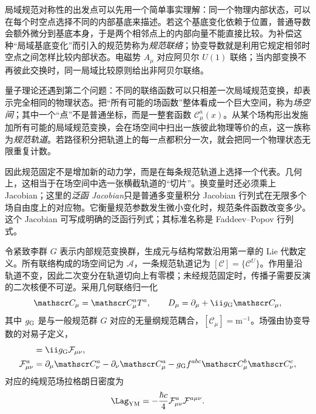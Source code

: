 局域规范对称性的出发点可以先用一个简单事实理解：同一个物理内部状态，可以在每个时空点选择不同的内部基底来描述。若这个基底变化依赖于位置，普通导数会额外微分到基底本身，于是两个相邻点上的内部向量不能直接比较。为补偿这种“局域基底变化”而引入的规范势称为\emph{规范联络}；协变导数就是利用它规定相邻时空点之间怎样比较内部状态。电磁势 $A_\mu$ 对应阿贝尔 $U(1)$ 联络；当内部变换不再彼此交换时，同一局域比较原则给出非阿贝尔联络。

量子理论还遇到第二个问题：不同的联络函数可以只相差一次局域规范变换，却表示完全相同的物理状态。把“所有可能的场函数”整体看成一个巨大空间，称为\emph{场空间}；其中一个“点”不是普通坐标，而是一整套函数 $\mathscr C_\mu^a(x)$。从某个场构形出发施加所有可能的局域规范变换，会在场空间中扫出一族彼此物理等价的点，这一族称为\emph{规范轨道}。若路径积分把轨道上的每一点都积分一次，就会把同一个物理状态无限重复计数。

因此规范固定不是增加新的动力学，而是在每条规范轨道上选择一个代表。几何上，这相当于在场空间中选一张横截轨道的“切片”。换变量时还必须乘上 Jacobian；这里的\emph{泛函 Jacobian}只是普通多变量积分 Jacobian 行列式在无限多个场自由度上的对应物。它衡量规范参数发生微小变化时，规范条件函数改变多少。这个 Jacobian 可写成明确的泛函行列式；其标准名称是 Faddeev--Popov 行列式。

令紧致李群 $G$ 表示内部规范变换群，生成元与结构常数沿用第一章的 Lie 代数定义。所有联络构成的场空间记为 $\mathscr A$，一条规范轨道记为 $[\mathscr C]=\{\mathscr C^U\}$。作用量沿轨道不变，因此二次变分在轨道切向上有零模；未经规范固定时，传播子需要反演的二次核便不可逆。采用几何联络归一化
\begin{equation}
 \mathscr C_\mu=\mathscr C_\mu^aT^a,
 \qquad
 D_\mu=\partial_\mu+\ii g_{\rm G}\mathscr C_\mu,
 \label{eq:generic-gauge-cov-derivative-dp11}
\end{equation}
其中 $g_{\rm G}$ 是与一般规范群 $G$ 对应的无量纲规范耦合，$[\mathscr C_\mu]=\mathrm{m^{-1}}$。场强由协变导数的对易子定义，
\begin{align}
 [D_\mu,D_\nu]&=\ii g_{\rm G}\mathcal F_{\mu\nu},\\
 \mathcal F_{\mu\nu}^a
 &=\partial_\mu\mathscr C_\nu^a-\partial_\nu\mathscr C_\mu^a
 -g_{\rm G} f^{abc}\mathscr C_\mu^b\mathscr C_\nu^c,
 \label{eq:generic-field-strength-dp11}
\end{align}
对应的纯规范场拉格朗日密度为
\begin{equation}
 \Lag_{\rm YM}
 =-\frac{\hbar c}{4}\mathcal F_{\mu\nu}^a\mathcal F^{a\mu\nu}.
 \label{eq:generic-ym-lagrangian-dp11}
\end{equation}

